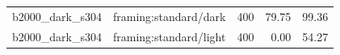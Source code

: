 \begin{longtable}{l>{\raggedright\arraybackslash}p{.42\linewidth}rrr}
b2000\_\allowbreak{}dark\_\allowbreak{}s304 & %
framing:standard/dark & %
400 & %
79.75 & %
99.36 \\ %

b2000\_\allowbreak{}dark\_\allowbreak{}s304 & %
framing:standard/light & %
400 & %
0.00 & %
54.27 \\ %


\end{longtable}
